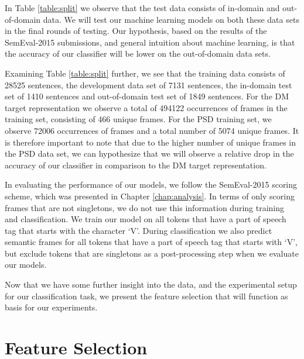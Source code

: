 In Table \ref{table:split} we observe that the test data consists of in-domain and out-of-domain data. We will test our machine learning models on both these data sets in the final rounds of testing. Our hypothesis, based on the results of the SemEval-2015 submissions, and general intuition about machine learning, is that the accuracy of our classifier will be lower on the out-of-domain data sets.

Examining Table \ref{table:split} further, we see that the training data consists of 28525 sentences, the development data set of 7131 sentences, the in-domain test set of 1410 sentences and out-of-domain test set of 1849 sentences. For the DM target representation we observe a total of 494122 occurrences of frames in the training set, consisting of 466 unique frames. For the PSD training set, we observe 72006 occurrences of frames and a total number of 5074 unique frames. It is therefore important to note that due to the higher number of unique frames in the PSD data set, we can hypothesize that we will observe a relative drop in the accuracy of our classifier in comparison to the DM target representation.

In evaluating the performance of our models, we follow the SemEval-2015 scoring scheme, which was presented in Chapter \ref{chap:analysis}. In terms of only scoring frames that are not singletons, we do not use this information during training and classification. We train our model on all tokens that have a part of speech tag that starts with the character `V'. During classification we also predict semantic frames for all tokens that have a part of speech tag that starts with `V', but exclude tokens that are singletons as a post-processing step when we evaluate our models.

Now that we have some further insight into the data, and the experimental setup for our classification task, we present the feature selection that will function as basis for our experiments.

\section{Feature Selection}
\label{features}

